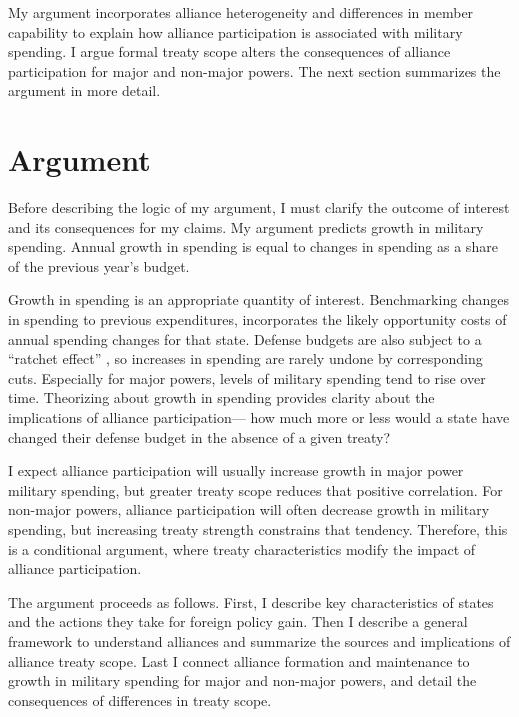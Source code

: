 \documentclass[12pt]{article}
\begin{document}
My argument incorporates alliance heterogeneity and differences in member capability to explain how alliance participation is associated with military spending. 
I argue formal treaty scope alters the consequences of alliance participation for major and non-major powers. 
The next section summarizes the argument in more detail. 



\section{Argument}

Before describing the logic of my argument, I must clarify the outcome of interest and its consequences for my claims. 
My argument predicts growth in military spending. 
Annual growth in spending is equal to changes in spending as a share of the previous year's budget. 


Growth in spending is an appropriate quantity of interest. 
Benchmarking changes in spending to previous expenditures, incorporates the likely opportunity costs of annual spending changes for that state. 
Defense budgets are also subject to a ``ratchet effect'' \cite{Zielinskietal2017}, so increases in spending are rarely undone by corresponding cuts.
Especially for major powers, levels of military spending tend to rise over time. 
Theorizing about growth in spending provides clarity about the implications of alliance participation--- how much more or less would a state have changed their defense budget in the absence of a given treaty? 


I expect alliance participation will usually increase growth in major power military spending, but greater treaty scope reduces that positive correlation. 
For non-major powers, alliance participation will often decrease growth in military spending, but increasing treaty strength constrains that tendency. 
Therefore, this is a conditional argument, where treaty characteristics modify the impact of alliance participation. 


The argument proceeds as follows.
First, I describe key characteristics of states and the actions they take for foreign policy gain. 
Then I describe a general framework to understand alliances and summarize the sources and implications of alliance treaty scope. 
Last I connect alliance formation and maintenance to growth in military spending for major and non-major powers, and detail the consequences of differences in treaty scope.  
\end{document}
